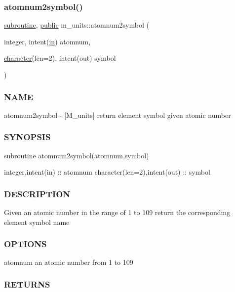 \subsubsection{\texorpdfstring{atomnum2symbol()}{atomnum2symbol()}}
{\footnotesize\ttfamily \hyperlink{M__stopwatch_83_8txt_acfbcff50169d691ff02d4a123ed70482}{subroutine}, \hyperlink{M__stopwatch_83_8txt_a2f74811300c361e53b430611a7d1769f}{public} m\+\_\+units\+::atomnum2symbol (\begin{DoxyParamCaption}\item[{integer, intent(\hyperlink{M__journal_83_8txt_afce72651d1eed785a2132bee863b2f38}{in})}]{atomnum,  }\item[{\hyperlink{option__stopwatch_83_8txt_abd4b21fbbd175834027b5224bfe97e66}{character}(len=2), intent(out)}]{symbol }\end{DoxyParamCaption})}



\subsubsection*{N\+A\+ME}

atomnum2symbol -\/ \mbox{[}M\+\_\+units\mbox{]} return element symbol given atomic number \subsubsection*{S\+Y\+N\+O\+P\+S\+IS}

subroutine atomnum2symbol(atomnum,symbol)

integer,intent(in) \+:\+: atomnum character(len=2),intent(out) \+:\+: symbol

\subsubsection*{D\+E\+S\+C\+R\+I\+P\+T\+I\+ON}

Given an atomic number in the range of 1 to 109 return the corresponding element symbol name

\subsubsection*{O\+P\+T\+I\+O\+NS}

atomnum an atomic number from 1 to 109

\subsubsection*{R\+E\+T\+U\+R\+NS}

